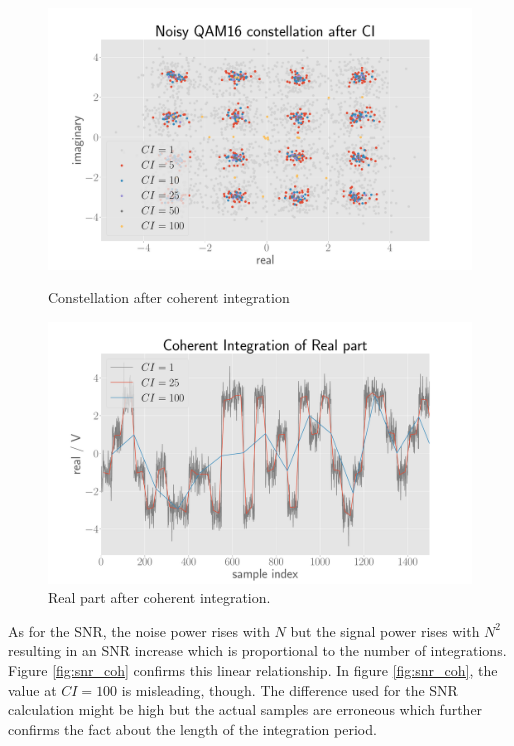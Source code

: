 \begin{figure}
    \centering
    \begin{minipage}{0.5\textwidth}
        \centering
        \includegraphics[width=1\textwidth]{graphics/ci_constellation.pdf} %
        \caption{Constellation after coherent integration}\label{fig:ci_const}
    \end{minipage}\hfill
    \begin{minipage}{0.5\textwidth}
        \centering
        \includegraphics[width=1\textwidth]{graphics/ci_real.pdf} %
        \caption{Real part after coherent integration.}\label{fig:ci_real}
    \end{minipage}
\end{figure}

As for the SNR, the noise power rises with $N$ but the signal power rises with $N^{2}$ resulting in an SNR increase which is proportional to the number of integrations. \cite{richards_pdf} Figure \ref{fig:snr_coh} confirms this linear relationship. In figure \ref{fig:snr_coh}, the value at $CI = 100$ is misleading, though. The difference used for the SNR calculation might be high but the actual samples are erroneous which further confirms the fact about the length of the integration period.

